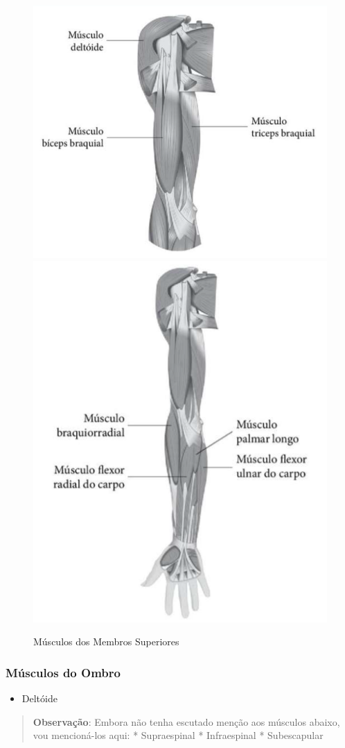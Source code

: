 \documentclass[
]{book}
\providecommand{\tightlist}{%
  \setlength{\itemsep}{0pt}\setlength{\parskip}{0pt}}
\begin{document}
\begin{figure}

{\centering \includegraphics[width=0.5\linewidth]{figuras/Aula5-4-musculos-do-ombro-e-braco} \includegraphics[width=0.5\linewidth]{figuras/Aula5-6-musculos-do-antebraco} 

}

\caption{Músculos dos Membros Superiores}\label{fig:unnamed-chunk-10}
\end{figure}

\hypertarget{muxfasculos-do-ombro}{%
\subsubsection{Músculos do Ombro}\label{muxfasculos-do-ombro}}

\begin{itemize}
\tightlist
\item
  Deltóide
\end{itemize}

\begin{quote}
\textbf{Observação}: Embora não tenha escutado menção aos músculos abaixo, vou mencioná-los aqui:
* Supraespinal
* Infraespinal
* Subescapular
\end{quote}
\end{document}
